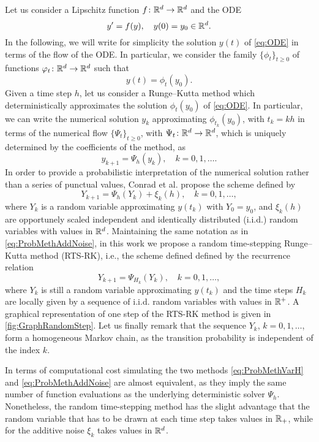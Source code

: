 \documentclass[10pt]{article}
\begin{document}
Let us consider a Lipschitz function $f\colon\mathbb{R}^d\to\mathbb{R}^d$ and the ODE
\begin{equation}\label{eq:ODE}
	y' = f(y), \quad y(0) = y_0 \in \mathbb{R}^d.
\end{equation}
In the following, we will write for simplicity the solution $y(t)$ of \eqref{eq:ODE} in terms of the flow of the ODE. In particular, we consider the family  $\{\phi_t\}_{t \geq 0}$ of functions $\varphi_t\colon\mathbb{R}^d\to\mathbb{R}^d$ such that 
\begin{equation}
	y(t) = \phi_t(y_0).
\end{equation}
Given a time step $h$, let us consider a Runge--Kutta method which deterministically approximates the solution $\phi_t(y_0)$ of \eqref{eq:ODE}. In particular, we can write the numerical solution $y_k$ approximating $\phi_{t_k}(y_0)$, with $t_k = kh$ in terms of the numerical flow $\{\Psi_t\}_{t \geq 0}$, with $\Psi_t\colon\mathbb{R}^d\to\mathbb{R}^d$, which is uniquely determined by the coefficients of the method, as
\begin{equation}
	y_{k+1} = \Psi_h(y_k), \quad k = 0, 1, \ldots.
\end{equation}
In order to provide a probabilistic interpretation of the numerical solution rather than a series of punctual values, Conrad et al. propose the scheme defined by
\begin{equation}\label{eq:ProbMethAddNoise}
	Y_{k+1} = \Psi_h(Y_{k}) + \xi_k(h), \quad k = 0, 1, \ldots,
\end{equation}
where $Y_k$ is a random variable approximating $y(t_k)$ with $Y_0 = y_0$, and $\xi_k(h)$ are opportunely scaled independent and identically distributed (i.i.d.) random variables with values in $\mathbb{R}^d$. Maintaining the same notation as in \eqref{eq:ProbMethAddNoise}, in this work we propose a random time-stepping Runge--Kutta method (RTS-RK), i.e., the scheme defined defined by the recurrence relation
\begin{equation}\label{eq:ProbMethVarH}
	Y_{k+1} = \Psi_{H_k}(Y_k), \quad k = 0, 1, \ldots,
\end{equation}
where $Y_k$ is still a random variable approximating $y(t_k)$ and the time steps $H_k$ are locally given by a sequence  of i.i.d. random variables with values in $\mathbb{R}^+$. A graphical representation of one step of the RTS-RK method is given in \cref{fig:GraphRandomStep}. Let us finally remark that the sequence $Y_k$, $k = 0, 1, \ldots$, form a homogeneous Markov chain, as the transition probability is independent of the index $k$.
\begin{remark} In terms of computational cost simulating the two methods \eqref{eq:ProbMethVarH} and \eqref{eq:ProbMethAddNoise} are almost equivalent, as they imply the same number of function evaluations as the underlying deterministic solver $\Psi_h$. Nonetheless, the random time-stepping method has the slight advantage that the random variable that has to be drawn at each time step takes values in $\mathbb{R}_+$, while for the additive noise $\xi_k$ takes values in $\mathbb{R}^d$.
\end{remark}
\end{document}
